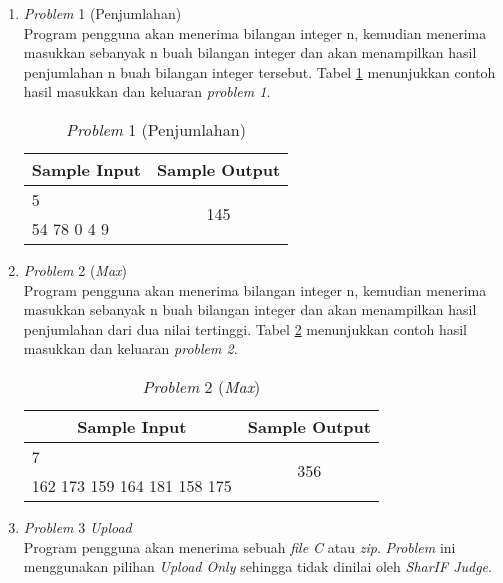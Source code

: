 \begin{enumerate}
	\item \textit{Problem} 1 (Penjumlahan) \\
	Program pengguna akan menerima bilangan integer n, kemudian menerima masukkan sebanyak n buah bilangan integer dan akan menampilkan hasil penjumlahan n buah bilangan integer tersebut. Tabel \ref{tab:problem_sum} menunjukkan contoh hasil masukkan dan keluaran \textit{problem 1}.
	
	\begin{table}[H]
		\centering 
		\caption{\textit{Problem} 1 (Penjumlahan)}
		\label{tab:problem_sum}
		\begin{tabular}{|c|c|}
			\hline
			Sample Input & Sample Output\\
			
			\hline
			\multicolumn{1}{|l|}{5} & \multirow{2}{*}{145}\\
			\multicolumn{1}{|l|}{54 78 0 4 9} & \\
			
			\hline
			
		\end{tabular} 
	\end{table}
	
	\item \textit{Problem} 2 (\textit{Max}) \\
	Program pengguna akan menerima bilangan integer n, kemudian menerima masukkan sebanyak n buah bilangan integer dan akan menampilkan hasil penjumlahan dari dua nilai tertinggi. Tabel \ref{tab:problem_max} menunjukkan contoh hasil masukkan dan keluaran \textit{problem 2}.
	
	\begin{table}[H]
		\centering 
		\caption{\textit{Problem} 2 (\textit{Max})}
		\label{tab:problem_max}
		\begin{tabular}{|c|c|}
			\hline
			Sample Input & Sample Output\\
			
			\hline
			\multicolumn{1}{|l|}{7} & \multirow{2}{*}{356}\\
			\multicolumn{1}{|l|}{162 173 159 164 181 158 175} & \\
			
			\hline
			
		\end{tabular} 
	\end{table}
	
	\item \textit{Problem} 3 \textit{Upload} \\
	Program pengguna akan menerima sebuah \textit{file C} atau \textit{zip}. \textit{Problem} ini menggunakan pilihan \textit{Upload Only} sehingga tidak dinilai oleh \textit{SharIF Judge}.
\end{enumerate}


